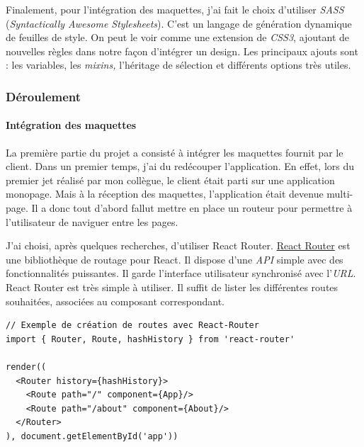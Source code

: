 \bigskip

Finalement, pour l'intégration des maquettes, j'ai fait le choix
d'utiliser \emph{SASS} (\emph{Syntactically Awesome Stylesheets}). C'est
un langage de génération dynamique de feuilles de style. On peut le voir
comme une extension de \emph{CSS3}, ajoutant de nouvelles règles dans
notre façon d'intégrer un design. Les principaux ajouts sont : les
variables, les \emph{mixins,} l'héritage de sélection et différents
options très utiles.

\bigskip

\subsubsection{Déroulement}\label{duxe9roulement}

\bigskip

\paragraph{Intégration des
maquettes}\label{intuxe9gration-des-maquettes}

\bigskip

La première partie du projet a consisté à intégrer les maquettes fournit
par le client. Dans un premier temps, j'ai du redécouper l'application.
En effet, lors du premier jet réalisé par mon collègue, le client était
parti sur une application monopage. Mais à la réception des maquettes,
l'application était devenue multi-page. Il a donc tout d'abord fallut
mettre en place un routeur pour permettre à l'utilisateur de naviguer
entre les pages.

\bigskip

J'ai choisi, après quelques recherches, d'utiliser React Router.
\href{https://github.com/ReactTraining/react-router}{React Router} est
une bibliothèque de routage pour React. Il dispose d'une \emph{API}
simple avec des fonctionnalités puissantes. Il garde l'interface
utilisateur synchronisé avec l'\emph{URL}. React Router est très simple
à utiliser. Il suffit de lister les différentes routes souhaitées,
associées au composant correspondant.

\begin{verbatim}
// Exemple de création de routes avec React-Router
import { Router, Route, hashHistory } from 'react-router'

render((
  <Router history={hashHistory}>
    <Route path="/" component={App}/>
    <Route path="/about" component={About}/>
  </Router>
), document.getElementById('app'))
\end{verbatim}

